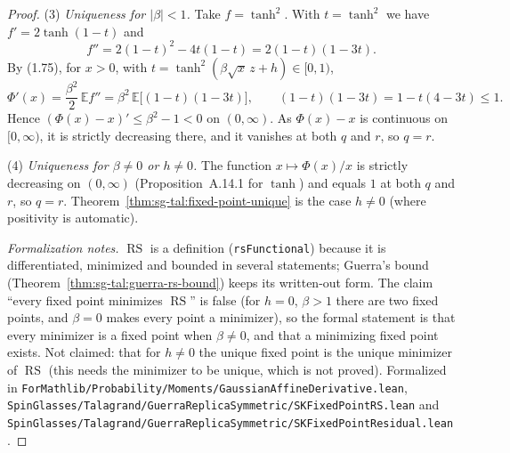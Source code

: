 \begin{proof}
(3) \emph{Uniqueness for $|\beta|<1$.} Take $f=\tanh^2$. With $t=\tanh^2$ we have $f'=2\tanh(1-t)$ and
\[
f''=2(1-t)^2-4t(1-t)=2(1-t)(1-3t).
\]
By (1.75), for $x>0$, with $t=\tanh^2(\beta\sqrt x\,z+h)\in[0,1)$,
\[
\Phi'(x)=\frac{\beta^2}{2}\,\mathbb E f''=\beta^2\,\mathbb E\big[(1-t)(1-3t)\big],\qquad (1-t)(1-3t)=1-t(4-3t)\le1 .
\]
Hence $(\Phi(x)-x)'\le\beta^2-1<0$ on $(0,\infty)$. As $\Phi(x)-x$ is continuous on $[0,\infty)$, it is strictly decreasing there, and it vanishes at both $q$ and $r$, so $q=r$.

(4) \emph{Uniqueness for $\beta\ne0$ or $h\ne0$.} The function $x\mapsto\Phi(x)/x$ is strictly decreasing on $(0,\infty)$ (Proposition~A.14.1 for $\tanh$) and equals $1$ at both $q$ and $r$, so $q=r$. Theorem~\ref{thm:sg-tal:fixed-point-unique} is the case $h\ne0$ (where positivity is automatic).

\emph{Formalization notes.} $\operatorname{RS}$ is a definition (\texttt{rsFunctional}) because it is differentiated, minimized and bounded in several statements; Guerra's bound (Theorem~\ref{thm:sg-tal:guerra-rs-bound}) keeps its written-out form. The claim ``every fixed point minimizes $\operatorname{RS}$'' is false (for $h=0$, $\beta>1$ there are two fixed points, and $\beta=0$ makes every point a minimizer), so the formal statement is that every minimizer is a fixed point when $\beta\ne0$, and that a minimizing fixed point exists. Not claimed: that for $h\ne0$ the unique fixed point is the unique minimizer of $\operatorname{RS}$ (this needs the minimizer to be unique, which is not proved).
Formalized in \texttt{ForMathlib/Probability/Moments/GaussianAffineDerivative.lean}, \texttt{SpinGlasses/Talagrand/GuerraReplicaSymmetric/SKFixedPointRS.lean} and \texttt{SpinGlasses/Talagrand/GuerraReplicaSymmetric/SKFixedPointResidual.lean}.
\end{proof}

